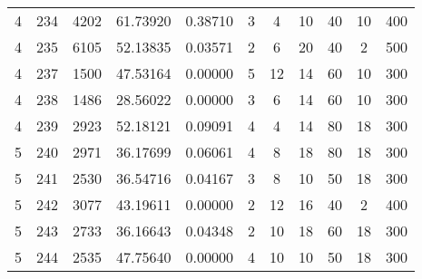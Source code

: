\begin{table}[ht]
\begin{tabular}{ccccccccccc}
        4   &234	&4202	&61.73920	&0.38710	&3	&4	&10	&40	&10	&400\\
        4   &235	&6105	&52.13835	&0.03571	&2	&6	&20	&40	&2	&500\\
        4   &237	&1500	&47.53164	&0.00000	&5	&12	&14	&60	&10	&300\\
        4   &238	&1486	&28.56022	&0.00000	&3	&6	&14	&60	&10	&300\\
        4   &239	&2923	&52.18121	&0.09091	&4	&4	&14	&80	&18	&300\\

        5   &240	&2971	&36.17699	&0.06061	&4	&8	&18	&80	&18	&300\\
        5   &241	&2530	&36.54716	&0.04167	&3	&8	&10	&50	&18	&300\\
        5   &242	&3077	&43.19611	&0.00000	&2	&12	&16	&40	&2	&400\\
        5   &243	&2733	&36.16643	&0.04348	&2	&10	&18	&60	&18	&300\\
        5   &244	&2535	&47.75640	&0.00000	&4	&10	&10	&50	&18	&300\\
    \hline\hline
	\end{tabular}
\end{table}

